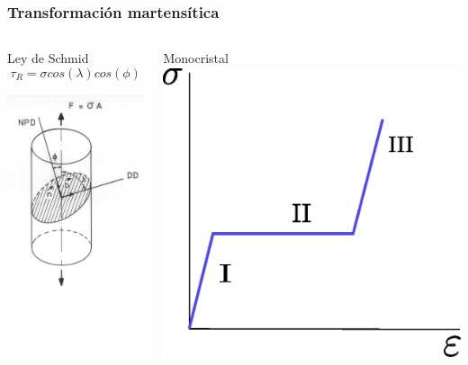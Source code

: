 \documentclass[usenames,dvipsnames]{beamer}
\begin{document}
\begin{frame}
\frametitle{Transformación martensítica}

\begin{columns}

\begin{block}{Ley de Schmid}
\begin{equation*}
 \tau_{R}= \sigma cos(\lambda)cos(\phi)
\end{equation*}

\begin{center}
\includegraphics[width=0.5\columnwidth]{img/intro/tension.png}
\end{center}

\end{block}


\pause
\begin{block}{Monocristal}
\includegraphics[height=0.35\textheight]{img/intro/SigmavsDef.eps} 
\end{block}


\end{columns}
\end{frame}
\end{document}
